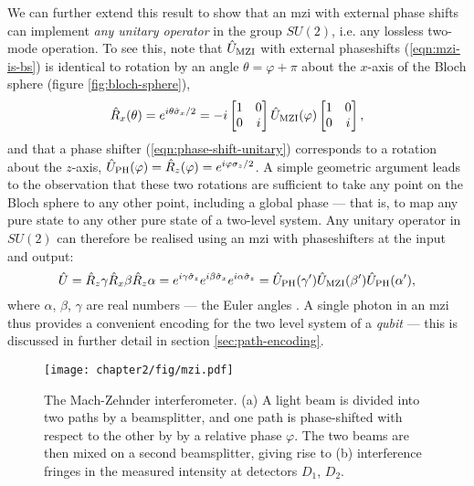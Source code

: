 We can further extend this result to show that an \gls{mzi} with external phase shifts can implement \emph{any unitary operator} in the group $SU(2)$, i.e. any lossless two-mode operation. To see this, note that $\hat{U}_\mathrm{MZI}$ with external phaseshifts (\ref{eqn:mzi-is-bs}) is identical to rotation by an angle $\theta = \varphi + \pi$ about the $x$-axis of the Bloch sphere (figure \ref{fig:bloch-sphere}), 
\begin{equation}
\hat{R}_x(\theta) = e^{i \theta \hat{\sigma}_x /2} 
= 
-i \begin{bmatrix} 1 & 0 \\ 0 & i \end{bmatrix}
\hat{U}_{\mathrm{MZI}}(\varphi) 
\begin{bmatrix} 1 & 0 \\ 0 & i \end{bmatrix}
,
\end{equation}
and that a phase shifter (\ref{eqn:phase-shift-unitary}) corresponds to a rotation about the $z$-axis, $\hat{U}_\text{PH}(\varphi) = \hat{R}_z(\varphi) = e^{i \varphi \sigma_z /2}$. A simple geometric argument leads to the observation that these two rotations are sufficient to take any point on the Bloch sphere to any other point, including a global phase --- that is, to map any pure state to any other pure state of a two-level system. Any unitary operator in $SU(2)$ can therefore be realised using an \gls{mzi} with phaseshifters at the input and output: 
\begin{equation}
\hat{U}  
= \hat{R}_z{\gamma}\hat{R}_x{\beta} \hat{R}_z{\alpha} 
= e^{i \gamma \hat{\sigma}_z}e^{i \beta \hat{\sigma}_x} e^{i \alpha \hat{\sigma}_z} 
= \hat{U}_\text{PH}(\gamma') \hat{U}_{\mathrm{MZI}}(\beta') \hat{U}_\text{PH}(\alpha'),
\end{equation}
where $\alpha$, $\beta$, $\gamma$ are real numbers --- the Euler angles \cite{Tilma2002}.
A single photon in an \gls{mzi} thus provides a convenient encoding for the two level system of a \emph{qubit} --- this is discussed in further detail in section \ref{sec:path-encoding}.

\begin{figure}[t!] \centering
\texttt{[image: chapter2/fig/mzi.pdf]}
\caption[Mach-Zehnder interferometer]{ 
The Mach-Zehnder interferometer. (a) A light beam is divided into two paths by a beamsplitter, and one path is phase-shifted with respect to the other by by a relative phase $\varphi$. The two beams are then mixed on a second beamsplitter, giving rise to (b) interference fringes in the measured intensity at detectors $D_1$, $D_2$.  }
\label{fig:mach-zehnder} \end{figure}


